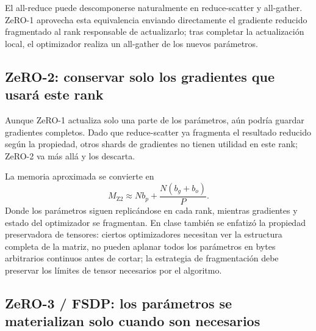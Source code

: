
El all-reduce puede descomponerse naturalmente en reduce-scatter y all-gather. ZeRO-1 aprovecha esta equivalencia enviando directamente el gradiente reducido fragmentado al rank responsable de actualizarlo; tras completar la actualización local, el optimizador realiza un all-gather de los nuevos parámetros.


\subsection{ZeRO-2: conservar solo los gradientes que usará este rank}

Aunque ZeRO-1 actualiza solo una parte de los parámetros, aún podría guardar gradientes completos. Dado que reduce-scatter ya fragmenta el resultado reducido según la propiedad, otros shards de gradientes no tienen utilidad en este rank; ZeRO-2 va más allá y los descarta.



La memoria aproximada se convierte en
\[
M_{\mathrm{Z2}}\approx Nb_p+\frac{N(b_g+b_o)}{P}.
\]
Donde los parámetros siguen replicándose en cada rank, mientras gradientes y estado del optimizador se fragmentan. En clase también se enfatizó la propiedad preservadora de tensores: ciertos optimizadores necesitan ver la estructura completa de la matriz, no pueden aplanar todos los parámetros en bytes arbitrarios continuos antes de cortar; la estrategia de fragmentación debe preservar los límites de tensor necesarios por el algoritmo.


\subsection{ZeRO-3 / FSDP: los parámetros se materializan solo cuando son necesarios}

